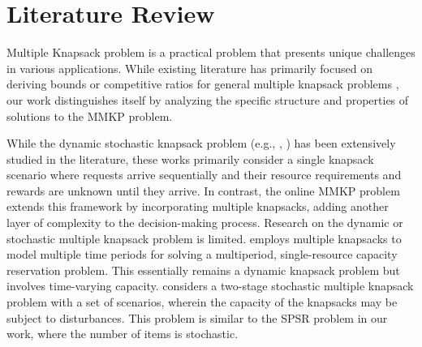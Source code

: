 \section{Literature Review}\label{literature}

Multiple Knapsack problem \citep{martello1990knapsack} is a practical problem that presents unique challenges in various applications. While existing literature has primarily focused on deriving bounds or competitive ratios for general multiple knapsack problems \citep{khuri1994zero, ferreira1996solving, pisinger1999exact, chekuri2005polynomial}, our work distinguishes itself by analyzing the specific structure and properties of solutions to the MMKP problem. 





While the dynamic stochastic knapsack problem (e.g., \citet{kleywegt1998dynamic, kleywegt2001dynamic}, \citet{papastavrou1996dynamic}) has been extensively studied in the literature, these works primarily consider a single knapsack scenario where requests arrive sequentially and their resource requirements and rewards are unknown until they arrive. In contrast, the online MMKP problem extends this framework by incorporating multiple knapsacks, adding another layer of complexity to the decision-making process.
Research on the dynamic or stochastic multiple knapsack problem is limited. \citet{perry2009approximate} employs multiple knapsacks to model multiple time periods for solving a multiperiod, single-resource capacity reservation problem. This essentially remains a dynamic knapsack problem but involves time-varying capacity. \citet{tonissen2017column} considers a two-stage stochastic multiple knapsack problem with a set of scenarios, wherein the capacity of the knapsacks may be subject to disturbances. This problem is similar to the SPSR problem in our work, where the number of items is stochastic.


